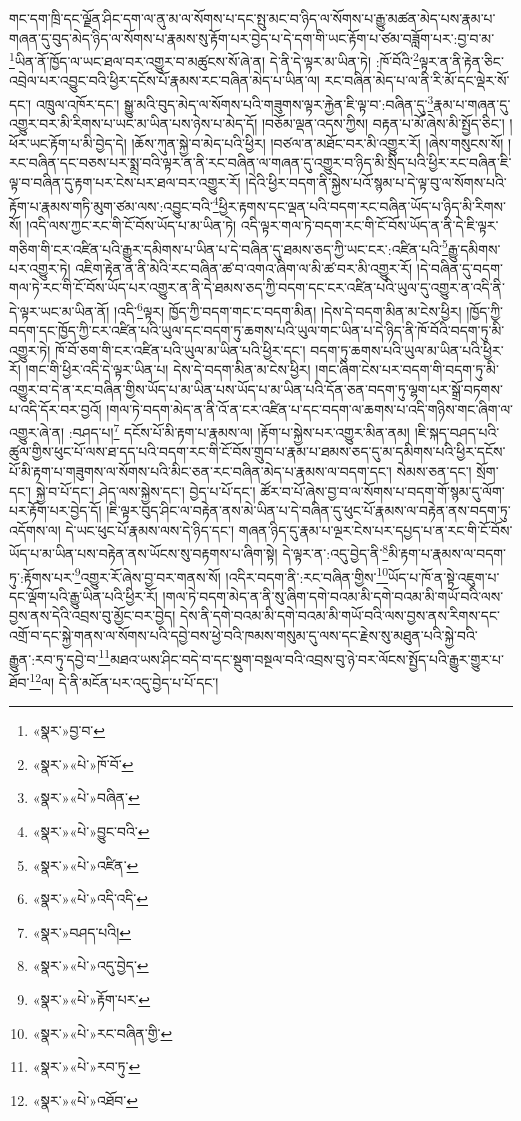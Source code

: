 གང་དག་ཁྲི་དང་ལྗོན་ཤིང་དག་ལ་ནུ་མ་ལ་སོགས་པ་དང་སྤུ་མང་བ་ཉིད་ལ་སོགས་པ་རྒྱུ་མཚན་མེད་པས་རྣམ་པ་གཞན་དུ་བུད་མེད་ཉིད་ལ་སོགས་པ་རྣམས་སུ་རྟོག་པར་བྱེད་པ་དེ་དག་གི་ཡང་རྟོག་པ་ཙམ་བཟློག་པར་:བྱ་བ་མ་\footnote{«སྣར་»བྱ་བ་}ཡིན་ནོ་ཁྱོད་ལ་ཡང་ཐལ་བར་འགྱུར་བ་མཚུངས་སོ་ཞེ་ན། དེ་ནི་དེ་ལྟར་མ་ཡིན་ཏེ། :ཁོ་བོའི་\footnote{«སྣར་»«པེ་»ཁོ་བོ་}ལྟར་ན་ནི་རྟེན་ཅིང་འབྲེལ་པར་འབྱུང་བའི་ཕྱིར་དངོས་པོ་རྣམས་རང་བཞིན་མེད་པ་ཡིན་ལ། རང་བཞིན་མེད་པ་ལ་ནི་རི་མོ་དང་ལྡེར་སོ་དང་། འཁྲུལ་འཁོར་དང་། སྒྱུ་མའི་བུད་མེད་ལ་སོགས་པའི་གཟུགས་ལྟར་རྐྱེན་ཇི་ལྟ་བ་:བཞིན་དུ་\footnote{«སྣར་»«པེ་»བཞིན་}རྣམ་པ་གཞན་དུ་འགྱུར་བར་མི་རིགས་པ་ཡང་མ་ཡིན་པས་ཉེས་པ་མེད་དོ། །བཅོམ་ལྡན་འདས་ཀྱིས། བརྟན་པ་མོ་ཞེས་མི་སྤྱོད་ཅིང་། །ཕོར་ཡང་རྟོག་པ་མི་བྱེད་དེ། །ཆོས་ཀུན་སྐྱེ་བ་མེད་པའི་ཕྱིར། །བཙལ་ན་མཐོང་བར་མི་འགྱུར་རོ། །ཞེས་གསུངས་སོ། །རང་བཞིན་དང་བཅས་པར་སྨྲ་བའི་ལྟར་ན་ནི་རང་བཞིན་ལ་གཞན་དུ་འགྱུར་བ་ཉིད་མི་སྲིད་པའི་ཕྱིར་རང་བཞིན་ཇི་ལྟ་བ་བཞིན་དུ་རྟག་པར་ངེས་པར་ཐལ་བར་འགྱུར་རོ། །དེའི་ཕྱིར་བདག་ནི་སྐྱེས་པའོ་སྙམ་པ་དེ་ལྟ་བུ་ལ་སོགས་པའི་རྟོག་པ་རྣམས་གཏི་མུག་ཙམ་ལས་:འབྱུང་བའི་\footnote{«སྣར་»«པེ་»བྱུང་བའི་}ཕྱིར་རྟགས་དང་ལྡན་པའི་བདག་རང་བཞིན་ཡོད་པ་ཉིད་མི་རིགས་སོ། །འདི་ལས་ཀྱང་རང་གི་ངོ་བོས་ཡོད་པ་མ་ཡིན་ཏེ། འདི་ལྟར་གལ་ཏེ་བདག་རང་གི་ངོ་བོས་ཡོད་ན་ནི་དེ་ཇི་ལྟར་གཅིག་གི་ངར་འཛིན་པའི་རྒྱུར་དམིགས་པ་ཡིན་པ་དེ་བཞིན་དུ་ཐམས་ཅད་ཀྱི་ཡང་ངར་:འཛིན་པའི་\footnote{«སྣར་»«པེ་»འཛིན་}རྒྱུ་དམིགས་པར་འགྱུར་ཏེ། འཇིག་རྟེན་ན་ནི་མེའི་རང་བཞིན་ཚ་བ་འགའ་ཞིག་ལ་མི་ཚ་བར་མི་འགྱུར་རོ། །དེ་བཞིན་དུ་བདག་གལ་ཏེ་རང་གི་ངོ་བོས་ཡོད་པར་འགྱུར་ན་ནི་དེ་ཐམས་ཅད་ཀྱི་བདག་དང་ངར་འཛིན་པའི་ཡུལ་དུ་འགྱུར་ན་འདི་ནི་དེ་ལྟར་ཡང་མ་ཡིན་ནོ། །འདི་\footnote{«སྣར་»«པེ་»འདི་འདི་}ལྟར། ཁྱོད་ཀྱི་བདག་གང་ང་བདག་མིན། །དེས་དེ་བདག་མིན་མ་ངེས་ཕྱིར། །ཁྱོད་ཀྱི་བདག་དང་ཁྱོད་ཀྱི་ངར་འཛིན་པའི་ཡུལ་དང་བདག་ཏུ་ཆགས་པའི་ཡུལ་གང་ཡིན་པ་དེ་ཉིད་ནི་ཁོ་བོའི་བདག་ཏུ་མི་འགྱུར་ཏེ། ཁོ་བོ་ཅག་གི་ངར་འཛིན་པའི་ཡུལ་མ་ཡིན་པའི་ཕྱིར་དང་། བདག་ཏུ་ཆགས་པའི་ཡུལ་མ་ཡིན་པའི་ཕྱིར་རོ། །གང་གི་ཕྱིར་འདི་དེ་ལྟར་ཡིན་པ། དེས་དེ་བདག་མིན་མ་ངེས་ཕྱིར། །གང་ཞིག་ངེས་པར་བདག་གི་བདག་ཏུ་མི་འགྱུར་བ་དེ་ན་རང་བཞིན་གྱིས་ཡོད་པ་མ་ཡིན་པས་ཡོད་པ་མ་ཡིན་པའི་དོན་ཅན་བདག་ཏུ་ལྷག་པར་སྒྲོ་བཏགས་པ་འདི་དོར་བར་བྱའོ། །གལ་ཏེ་བདག་མེད་ན་ནི་འོ་ན་ངར་འཛིན་པ་དང་བདག་ལ་ཆགས་པ་འདི་གཉིས་གང་ཞིག་ལ་འགྱུར་ཞེ་ན། :བཤད་པ།\footnote{«སྣར་»བཤད་པའི།} དངོས་པོ་མི་རྟག་པ་རྣམས་ལ། །རྟོག་པ་སྐྱེས་པར་འགྱུར་མིན་ནམ། །ཇི་སྐད་བཤད་པའི་ཚུལ་གྱིས་ཕུང་པོ་ལས་ཐ་དད་པའི་བདག་རང་གི་ངོ་བོས་གྲུབ་པ་རྣམ་པ་ཐམས་ཅད་དུ་མ་དམིགས་པའི་ཕྱིར་དངོས་པོ་མི་རྟག་པ་གཟུགས་ལ་སོགས་པའི་མིང་ཅན་རང་བཞིན་མེད་པ་རྣམས་ལ་བདག་དང་། སེམས་ཅན་དང་། སྲོག་དང་། སྐྱེ་བ་པོ་དང་། ཤེད་ལས་སྐྱེས་དང་། བྱེད་པ་པོ་དང་། ཚོར་བ་པོ་ཞེས་བྱ་བ་ལ་སོགས་པ་བདག་གོ་སྙམ་དུ་ལོག་པར་རྟོག་པར་བྱེད་དོ། །ཇི་ལྟར་བུད་ཤིང་ལ་བརྟེན་ནས་མེ་ཡིན་པ་དེ་བཞིན་དུ་ཕུང་པོ་རྣམས་ལ་བརྟེན་ནས་བདག་ཏུ་འདོགས་ལ། དེ་ཡང་ཕུང་པོ་རྣམས་ལས་དེ་ཉིད་དང་། གཞན་ཉིད་དུ་རྣམ་པ་ལྔར་ངེས་པར་དཔྱད་པ་ན་རང་གི་ངོ་བོས་ཡོད་པ་མ་ཡིན་པས་བརྟེན་ནས་ཡོངས་སུ་བརྟགས་པ་ཞིག་སྟེ། དེ་ལྟར་ན་:འདུ་བྱེད་ནི་\footnote{«སྣར་»«པེ་»འདུ་བྱེད་}མི་རྟག་པ་རྣམས་ལ་བདག་ཏུ་:རྟོགས་པར་\footnote{«སྣར་»«པེ་»རྟོག་པར་}འགྱུར་རོ་ཞེས་བྱ་བར་གནས་སོ། །འདིར་བདག་ནི་:རང་བཞིན་གྱིས་\footnote{«སྣར་»«པེ་»རང་བཞིན་གྱི་}ཡོད་པ་ཁོ་ན་སྟེ་འཇུག་པ་དང་ལྡོག་པའི་རྒྱུ་ཡིན་པའི་ཕྱིར་རོ། །གལ་ཏེ་བདག་མེད་ན་ནི་སུ་ཞིག་དགེ་བའམ་མི་དགེ་བའམ་མི་གཡོ་བའི་ལས་བྱས་ནས་དེའི་འབྲས་བུ་མྱོང་བར་བྱེད། དེས་ནི་དགེ་བའམ་མི་དགེ་བའམ་མི་གཡོ་བའི་ལས་བྱས་ནས་རིགས་དང་འགྲོ་བ་དང་སྐྱེ་གནས་ལ་སོགས་པའི་དབྱེ་བས་ཕྱེ་བའི་ཁམས་གསུམ་དུ་ལས་དང་རྗེས་སུ་མཐུན་པའི་སྐྱེ་བའི་རྒྱུན་:རབ་ཏུ་དབྱེ་བ་\footnote{«སྣར་»«པེ་»རབ་ཏུ་}མཐའ་ཡས་ཤིང་བདེ་བ་དང་སྡུག་བསྔལ་བའི་འབྲས་བུ་ཉེ་བར་ལོངས་སྤྱོད་པའི་རྒྱུར་གྱུར་པ་ཐོབ་\footnote{«སྣར་»«པེ་»འཐོབ་}ལ། དེ་ནི་མངོན་པར་འདུ་བྱེད་པ་པོ་དང་། 